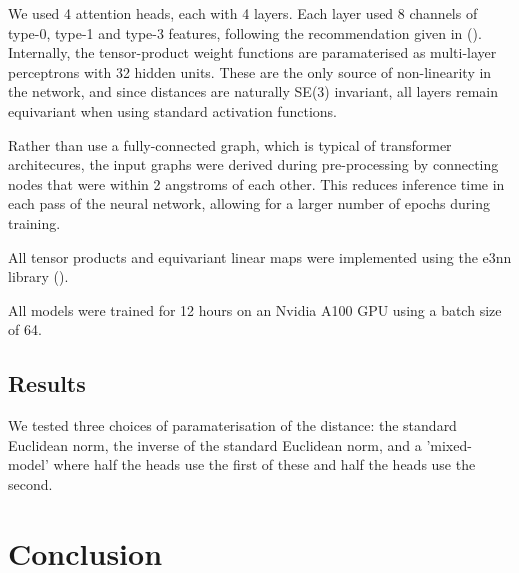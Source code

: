 \documentclass[11pt]{article}
\begin{document}
We used 4 attention heads, each with 4 layers. Each layer used 8 channels of type-0, type-1 and type-3 features, following the recommendation given in (\cite{rototranslational}). Internally, the tensor-product weight functions are paramaterised as multi-layer perceptrons with 32 hidden units. These are the only source of non-linearity in the network, and since distances are naturally SE(3) invariant, all layers remain equivariant when using standard activation functions.

Rather than use a fully-connected graph, which is typical of transformer architecures, the input graphs were derived during pre-processing by connecting nodes that were within 2 angstroms of each other. This reduces inference time in each pass of the neural network, allowing for a larger number of epochs during training.  

All tensor products and equivariant linear maps were implemented using the e3nn library (\cite{geiger2022e3nn}).

All models were trained for 12 hours on an Nvidia A100 GPU using a batch size of 64.

\subsection{Results}

We tested three choices of paramaterisation of the distance: the standard Euclidean norm, the inverse of the standard Euclidean norm, and a 'mixed-model' where half the heads use the first of these and half the heads use the second.

\section{Conclusion}
\end{document}
